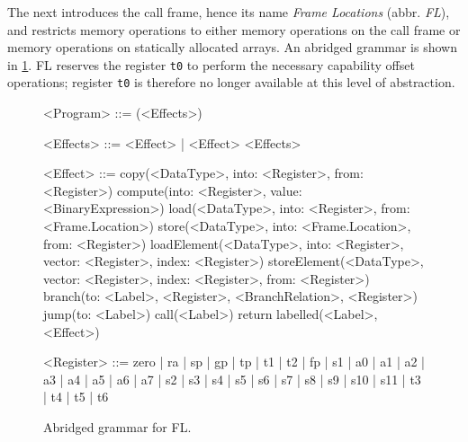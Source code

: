 \documentclass[main.tex]{subfiles}
\begin{document}
The next \il{} introduces the call frame, hence its name \emph{Frame Locations} (abbr. \emph{FL}), and restricts memory operations to either memory operations on the call frame or memory operations on statically allocated arrays. An abridged grammar is shown in \cref{bnf:fl}. FL reserves the register \texttt{t0} to perform the necessary capability offset operations; register \texttt{t0} is therefore no longer available at this level of abstraction.

\begin{figure}[ht]
	\begin{grammar}
		
		<Program> ::= (<Effects>)
		
		<Effects> ::= <Effect> | <Effect> <Effects>
		
		<Effect> ::= copy(<DataType>, into: <Register>, from: <Register>)
			\alt compute(into: <Register>, value: <BinaryExpression>)
			\alt load(<DataType>, into: <Register>, from: <Frame.Location>)
			\alt store(<DataType>, into: <Frame.Location>, from: <Register>)
			\alt loadElement(<DataType>, into: <Register>, vector: <Register>, index: <Register>)
			\alt storeElement(<DataType>, vector: <Register>, index: <Register>, from: <Register>)
			\alt branch(to: <Label>, <Register>, <BranchRelation>, <Register>)
			\alt jump(to: <Label>)
			\alt call(<Label>)
			\alt return
			\alt labelled(<Label>, <Effect>)
			
		<Register> ::= zero | ra | sp | gp | tp | t1 | t2 | fp | s1 | a0 | a1 | a2 | a3 | a4 | a5 | a6 | a7 | s2 | s3 | s4 | s5 | s6 | s7 | s8 | s9 | s10 | s11 | t3 | t4 | t5 | t6
		
	\end{grammar}
	\caption{Abridged grammar for FL.}
	\label{bnf:fl}
\end{figure}


\biblio{}
\onlyinsubfile{\glsaddall\printglossaries}
\end{document}
